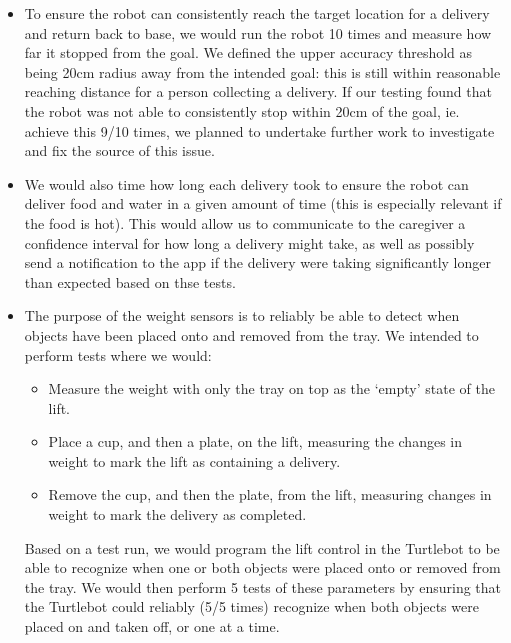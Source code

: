\documentclass{article}
\begin{document}
\begin{itemize}
\item To ensure the robot can consistently reach the target location for a delivery and return back to base, we would run the robot 10 times and measure how far it stopped from the goal. We defined the upper accuracy threshold as being 20cm radius away from the intended goal: this is still within reasonable reaching distance for a person collecting a delivery. If our testing found that the robot was not able to consistently stop within 20cm of the goal, ie. achieve this 9/10 times, we planned to undertake further work to investigate and fix the source of this issue. 
\item We would also time how long each delivery took to ensure the robot can deliver food and water in a given amount of time (this is especially relevant if the food is hot). This would allow us to communicate to the caregiver a confidence interval for how long a delivery might take, as well as possibly send a notification to the app if the delivery were taking significantly longer than expected based on thse tests.
\item The purpose of the weight sensors is to reliably be able to detect when objects have been placed onto and removed from the tray. We intended to perform tests where we would:
  \begin{itemize}
    \item Measure the weight with only the tray on top as the `empty' state of the lift.
    \item Place a cup, and then a plate, on the lift, measuring the changes in weight to mark the lift as containing a delivery. 
    \item Remove the cup, and then the plate, from the lift, measuring changes in weight to mark the delivery as completed. 
  \end{itemize}
  Based on a test run, we would program the lift control in the Turtlebot to be able to recognize when one or both objects were placed onto or removed from the tray. We would then perform 5 tests of these parameters by ensuring that the Turtlebot could reliably (5/5 times) recognize when both objects were placed on and taken off, or one at a time. 
\end{itemize}
\end{document}
